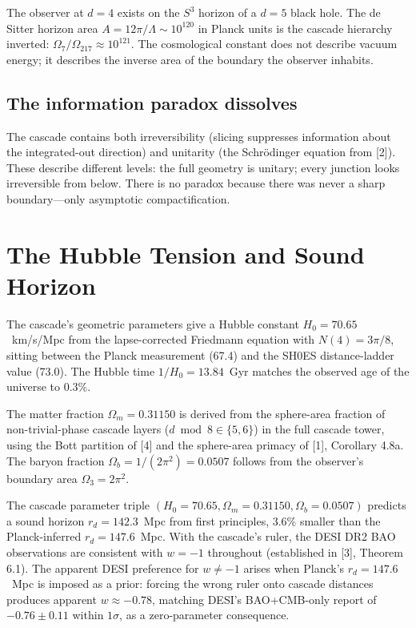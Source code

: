 \documentclass[12pt,a4paper]{article}
\begin{document}
The observer at $d = 4$ exists on the $S^3$ horizon of a $d = 5$ black hole. The de Sitter horizon area $A = 12\pi/\Lambda \sim 10^{120}$ in Planck units is the cascade hierarchy inverted: $\Omega_7/\Omega_{217} \approx 10^{121}$. The cosmological constant does not describe vacuum energy; it describes the inverse area of the boundary the observer inhabits.

\subsection{The information paradox dissolves}

The cascade contains both irreversibility (slicing suppresses information about the integrated-out direction) and unitarity (the Schr\"odinger equation from [2]). These describe different levels: the full geometry is unitary; every junction looks irreversible from below. There is no paradox because there was never a sharp boundary---only asymptotic compactification.

\section{The Hubble Tension and Sound Horizon}

The cascade's geometric parameters give a Hubble constant $H_0 = 70.65$~km/s/Mpc from the lapse-corrected Friedmann equation with $N(4) = 3\pi/8$, sitting between the Planck measurement (67.4) and the SH0ES distance-ladder value (73.0). The Hubble time $1/H_0 = 13.84$~Gyr matches the observed age of the universe to $0.3\%$.

The matter fraction $\Omega_m = 0.31150$ is derived from the sphere-area fraction of non-trivial-phase cascade layers ($d \bmod 8 \in \{5, 6\}$) in the full cascade tower, using the Bott partition of [4] and the sphere-area primacy of [1], Corollary 4.8a. The baryon fraction $\Omega_b = 1/(2\pi^2) = 0.0507$ follows from the observer's boundary area $\Omega_3 = 2\pi^2$.

The cascade parameter triple $(H_0 = 70.65, \Omega_m = 0.31150, \Omega_b = 0.0507)$ predicts a sound horizon $r_d = 142.3$~Mpc from first principles, 3.6\% smaller than the Planck-inferred $r_d = 147.6$~Mpc. With the cascade's ruler, the DESI DR2 BAO observations are consistent with $w = -1$ throughout (established in [3], Theorem 6.1). The apparent DESI preference for $w \neq -1$ arises when Planck's $r_d = 147.6$~Mpc is imposed as a prior: forcing the wrong ruler onto cascade distances produces apparent $w \approx -0.78$, matching DESI's BAO+CMB-only report of $-0.76 \pm 0.11$ within $1\sigma$, as a zero-parameter consequence.
\end{document}
